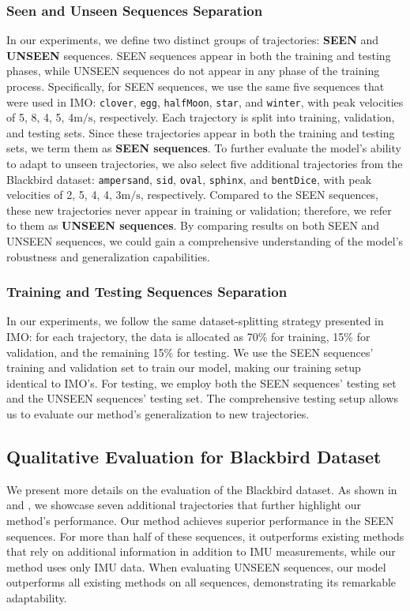 \subsubsection{Seen and Unseen Sequences Separation}
\label{sec:airio:seenunseen}
In our experiments, we define two distinct groups of trajectories: \textbf{SEEN} and \textbf{UNSEEN} sequences. SEEN sequences appear in both the training and testing phases, while UNSEEN sequences do not appear in any phase of the training process. Specifically, for SEEN sequences, we use the same five sequences that were used in IMO: \texttt{clover}, \texttt{egg}, \texttt{halfMoon}, \texttt{star}, and \texttt{winter}, with peak velocities of 5, 8, 4, 5, 4$\si{\meter\per\second}$, respectively. Each trajectory is split into training, validation, and testing sets. Since these trajectories appear in both the training and testing sets, we term them as \textbf{SEEN sequences}. To further evaluate the model's ability to adapt to unseen trajectories, we also select five additional trajectories from the Blackbird dataset: \texttt{ampersand}, \texttt{sid}, \texttt{oval}, \texttt{sphinx}, and \texttt{bentDice}, with peak velocities of 2, 5, 4, 4, 3$\si{\meter\per\second}$, respectively. Compared to the SEEN sequences, these new trajectories never appear in training or validation; therefore, we refer to them as \textbf{UNSEEN sequences}. By comparing results on both SEEN and UNSEEN sequences, we could gain a comprehensive understanding of the model's robustness and generalization capabilities.

\subsubsection{Training and Testing Sequences Separation}
In our experiments, we follow the same dataset-splitting strategy presented in IMO: for each trajectory, the data is allocated as 70\% for training, 15\% for validation, and the remaining 15\% for testing. We use the SEEN sequences' training and validation set to train our model, making our training setup identical to IMO's. For testing, we employ both the SEEN sequences' testing set and the UNSEEN sequences' testing set. The comprehensive testing setup allows us to evaluate our method's generalization to new trajectories.



\subsection{Qualitative Evaluation for Blackbird Dataset}
\label{sec:airio:blackbird_qual}
We present more details on the evaluation of the Blackbird dataset. As shown in  and , we showcase seven additional trajectories that further highlight our method's performance. Our method achieves superior performance in the SEEN sequences. For more than half of these sequences, it outperforms existing methods that rely on additional information in addition to IMU measurements, while our method uses only IMU data. When evaluating UNSEEN sequences, our model outperforms all existing methods on all sequences, demonstrating its remarkable adaptability.



